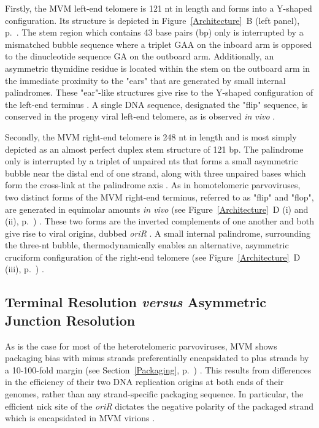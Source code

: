 Firstly, the MVM left-end telomere is 121 nt in length and forms into a Y-shaped configuration. Its structure is depicted in Figure~\ref{Architecture}~B (left panel), p.~\pageref{Architecture}. The stem region which contains 43 base pairs (bp) only is interrupted by a mismatched bubble sequence where a triplet GAA on the inboard arm is opposed to the dinucleotide sequence GA on the outboard arm. Additionally, an asymmetric thymidine residue is located within the stem on the outboard arm in the immediate proximity to the "ears" that are generated by small internal palindromes. These "ear"-like structures give rise to the Y-shaped configuration of the left-end terminus \cite{pmid225040, pmid6298737, pmid3973977, replication}. A single DNA sequence, designated the "flip" sequence, is conserved in the progeny viral left-end telomere, as is observed \textit{in vivo} \cite{pmid3973977}.  

Secondly, the MVM right-end telomere is 248 nt in length and is most simply depicted as an almost perfect duplex stem structure of 121 bp. The palindrome only is interrupted by a triplet of unpaired nts that forms a small asymmetric bubble near the distal end of one strand, along with three unpaired bases which form the cross-link at the palindrome axis \cite{pmid6298737, pmid3973977}. As in homotelomeric parvoviruses, two distinct forms of the MVM right-end terminus, referred to as "flip" and "flop", are generated in equimolar amounts \textit{in vivo} (see Figure~\ref{Architecture}~D (i) and (ii), p.~\pageref{Architecture}) \cite{telomere2, encapsidation}. These two forms are the inverted complements of one another and both give rise to viral origins, dubbed \textit{oriR} \cite{pmid1388310, pmid9765384, pmid10627544}. A small internal palindrome, surrounding the three-nt bubble, thermodynamically enables an alternative, asymmetric cruciform configuration of the right-end telomere (see Figure~\ref{Architecture}~D (iii), p.~\pageref{Architecture}) \cite{pmid6602687}. 


\subsection{Terminal Resolution \textit{versus} Asymmetric Junction Resolution}
\label{Resolution}

As is the case for most of the heterotelomeric parvoviruses, MVM shows packaging bias with minus strands preferentially encapsidated to plus strands by a 10-100-fold margin (see Section~\ref{Packaging}, p.~\pageref{Packaging}) \cite{pmid6828378, pmid3296697}. This results from differences in the efficiency of their two DNA replication origins at both ends of their genomes, rather than any strand-specific packaging sequence. In particular, the efficient nick site of the \textit{oriR} dictates the negative polarity of the packaged strand which is encapsidated in MVM virions \cite{pmid15681430}. 

